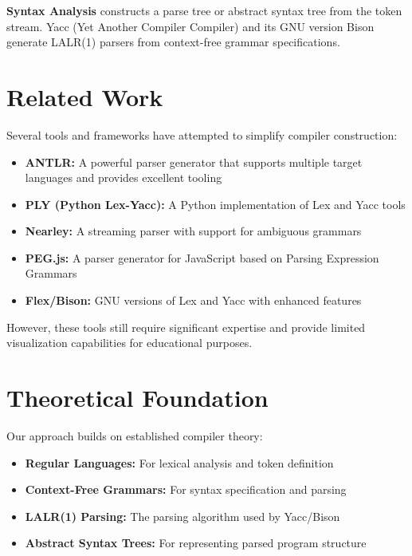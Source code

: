 \documentclass[a4paper,12pt]{report}
\begin{document}
\textbf{Syntax Analysis} constructs a parse tree or abstract syntax tree from the token stream. Yacc (Yet Another Compiler Compiler) and its GNU version Bison generate LALR(1) parsers from context-free grammar specifications.

\section{Related Work}
Several tools and frameworks have attempted to simplify compiler construction:

\begin{itemize}
    \item \textbf{ANTLR:} A powerful parser generator that supports multiple target languages and provides excellent tooling
    \item \textbf{PLY (Python Lex-Yacc):} A Python implementation of Lex and Yacc tools
    \item \textbf{Nearley:} A streaming parser with support for ambiguous grammars
    \item \textbf{PEG.js:} A parser generator for JavaScript based on Parsing Expression Grammars
    \item \textbf{Flex/Bison:} GNU versions of Lex and Yacc with enhanced features
\end{itemize}

However, these tools still require significant expertise and provide limited visualization capabilities for educational purposes.

\section{Theoretical Foundation}
Our approach builds on established compiler theory:
\begin{itemize}
    \item \textbf{Regular Languages:} For lexical analysis and token definition
    \item \textbf{Context-Free Grammars:} For syntax specification and parsing
    \item \textbf{LALR(1) Parsing:} The parsing algorithm used by Yacc/Bison
    \item \textbf{Abstract Syntax Trees:} For representing parsed program structure
\end{itemize}
\end{document}
